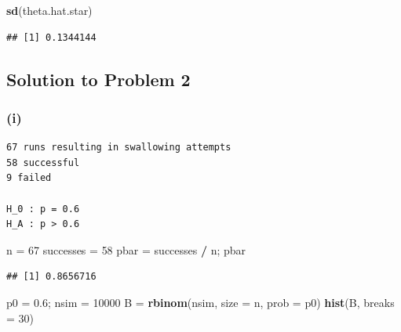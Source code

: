 \documentclass[]{article}
\newenvironment{Shaded}{\begin{snugshade}}{\end{snugshade}}
\newcommand{\DataTypeTok}[1]{\textcolor[rgb]{0.13,0.29,0.53}{#1}}
\newcommand{\DecValTok}[1]{\textcolor[rgb]{0.00,0.00,0.81}{#1}}
\newcommand{\FloatTok}[1]{\textcolor[rgb]{0.00,0.00,0.81}{#1}}
\newcommand{\KeywordTok}[1]{\textcolor[rgb]{0.13,0.29,0.53}{\textbf{#1}}}
\newcommand{\NormalTok}[1]{#1}
\newcommand{\OperatorTok}[1]{\textcolor[rgb]{0.81,0.36,0.00}{\textbf{#1}}}
\newcommand{\StringTok}[1]{\textcolor[rgb]{0.31,0.60,0.02}{#1}}
\begin{document}
\begin{Shaded}
\begin{Highlighting}[]
\KeywordTok{sd}\NormalTok{(theta.hat.star)}
\end{Highlighting}
\end{Shaded}

\begin{verbatim}
## [1] 0.1344144
\end{verbatim}

\hypertarget{solution-to-problem-2}{%
\subsection{Solution to Problem 2}\label{solution-to-problem-2}}

\hypertarget{i-1}{%
\subsubsection{(i)}\label{i-1}}

\begin{verbatim}
67 runs resulting in swallowing attempts
58 successful
9 failed

H_0 : p = 0.6
H_A : p > 0.6

\end{verbatim}

\begin{Shaded}
\begin{Highlighting}[]
\NormalTok{n =}\StringTok{ }\DecValTok{67}
\NormalTok{successes =}\StringTok{ }\DecValTok{58}
\NormalTok{pbar =}\StringTok{ }\NormalTok{successes }\OperatorTok{/}\StringTok{ }\NormalTok{n; pbar}
\end{Highlighting}
\end{Shaded}

\begin{verbatim}
## [1] 0.8656716
\end{verbatim}

\begin{Shaded}
\begin{Highlighting}[]
\NormalTok{p0 =}\StringTok{ }\FloatTok{0.6}\NormalTok{; nsim =}\StringTok{ }\DecValTok{10000}
\NormalTok{B =}\StringTok{ }\KeywordTok{rbinom}\NormalTok{(nsim, }\DataTypeTok{size =}\NormalTok{ n, }\DataTypeTok{prob =}\NormalTok{ p0)}
\KeywordTok{hist}\NormalTok{(B, }\DataTypeTok{breaks =} \DecValTok{30}\NormalTok{)}
\end{Highlighting}
\end{Shaded}
\end{document}
